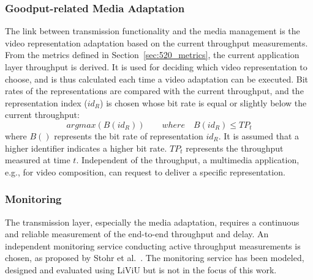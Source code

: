 \subsubsection{Goodput-related Media Adaptation}
The link between transmission functionality and the media management is the video representation adaptation based on the current throughput measurements.
From the metrics defined in Section~\ref{sec:520_metrics}, the current application layer throughput is derived.
It is used for deciding which video representation to choose, and is thus calculated each time a video adaptation can be executed.
Bit rates of the representations are compared with the current throughput, and the representation index ($id_{R}$) is chosen whose bit rate is equal or slightly below the current throughput:
\begin{equation}
\label{optQual:formula1}
argmax(B(id_{R})) \quad\quad where\quad B(id_{R}) \leq TP_t
\end{equation}
 where $B()$ represents the bit rate of representation $id_{R}$.
 It is assumed that a higher identifier indicates a higher bit rate.
$TP_t$ represents the throughput measured at time $t$.
Independent of the throughput, a multimedia application, e.g., for video composition, can request to deliver a specific representation.
\subsubsection{Monitoring}
The transmission layer, especially the media adaptation, requires a continuous and reliable measurement of the end-to-end throughput and delay.
An independent monitoring service conducting active throughput measurements is chosen, as proposed by Stohr et al.~\cite{Stohr2014,Stohr2016}.
The monitoring service has been modeled, designed and evaluated using \ac{LiViU} but is not in the focus of this work.
